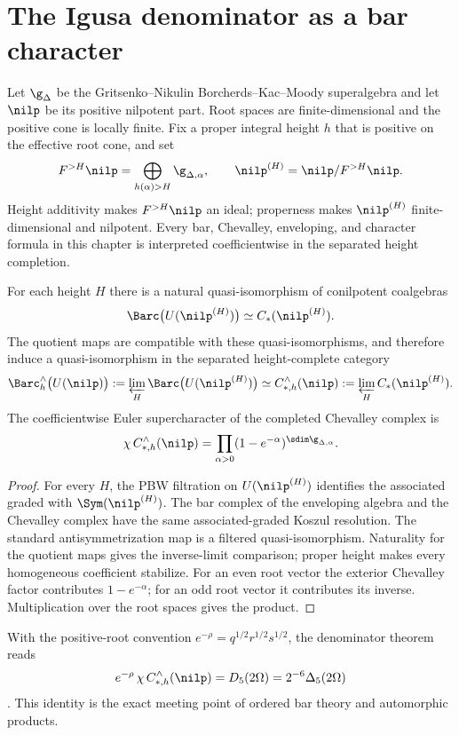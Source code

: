 \chapter{The Igusa denominator as a bar character}
Let $\g_\Delta$ be the Gritsenko--Nikulin Borcherds--Kac--Moody superalgebra and let $\nilp$ be its positive nilpotent part. Root spaces are finite-dimensional and the positive cone is locally finite. Fix a proper integral height $h$ that is positive on the effective root cone, and set
\[
 F^{>H}\nilp=\bigoplus_{h(\alpha)>H}\g_{\Delta,\alpha},
 \qquad
 \nilp^{(H)}=\nilp/F^{>H}\nilp.
\]
Height additivity makes $F^{>H}\nilp$ an ideal; properness makes $\nilp^{(H)}$ finite-dimensional and nilpotent. Every bar, Chevalley, enveloping, and character formula in this chapter is interpreted coefficientwise in the separated height completion.

\begin{theorem}
For each height $H$ there is a natural quasi-isomorphism of conilpotent coalgebras
\[
 \Barc\bigl(U(\nilp^{(H)})\bigr)\simeq C_*(\nilp^{(H)}).
\]
The quotient maps are compatible with these quasi-isomorphisms, and therefore induce a quasi-isomorphism in the separated height-complete category
\[
 \Barc_h^\wedge\bigl(U(\nilp)\bigr):=\varprojlim_H\Barc\bigl(U(\nilp^{(H)})\bigr)
 \simeq
 C_{*,h}^\wedge(\nilp):=\varprojlim_H C_*(\nilp^{(H)}).
\]
The coefficientwise Euler supercharacter of the completed Chevalley complex is
\[
 \chi\,C_{*,h}^\wedge(\nilp)
 =\prod_{\alpha>0}(1-e^{-\alpha})^{\sdim\g_{\Delta,\alpha}}.
\]
\end{theorem}
\begin{proof}
For every $H$, the PBW filtration on $U(\nilp^{(H)})$ identifies the associated graded with $\Sym(\nilp^{(H)})$. The bar complex of the enveloping algebra and the Chevalley complex have the same associated-graded Koszul resolution. The standard antisymmetrization map is a filtered quasi-isomorphism. Naturality for the quotient maps gives the inverse-limit comparison; proper height makes every homogeneous coefficient stabilize. For an even root vector the exterior Chevalley factor contributes $1-e^{-\alpha}$; for an odd root vector it contributes its inverse. Multiplication over the root spaces gives the product.
\end{proof}

With the positive-root convention $e^{-\rho}=q^{1/2}r^{1/2}s^{1/2}$, the denominator theorem reads
\[
 e^{-\rho}\,\chi\,C_{*,h}^\wedge(\nilp)=D_5(2\Omega)=2^{-6}\Delta_5(2\Omega)
\]
\cite{GN97,GN98b}. This identity is the exact meeting point of ordered bar theory and automorphic products.

